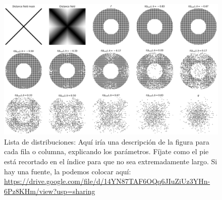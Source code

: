 \begin{figure}[htb!] %
\centering %
\includegraphics[width=\textwidth]{test-distribuciones}
\caption[Lista de distribuciones]{Lista de distribuciones: Aquí iría una descripción de la figura para cada fila o columna, explicando los parámetros. Fíjate como el pie está recortado en el índice para que no sea extremadamente largo. Si hay una fuente, la podemos colocar aquí: \url{https://drive.google.com/file/d/14YN87TAF6OQq6JIuZiUz3YHn-6Pz8KHm/view?usp=sharing}}
\label{fig:grafica} %
\end{figure}
